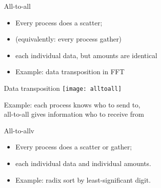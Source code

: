 
\begin{exerciseframe}[scangather]
  
\end{exerciseframe}

\begin{numberedframe}{All-to-all}
  \begin{itemize}
  \item Every process does a scatter;
  \item (equivalently: every process gather)
  \item each individual data, but amounts are identical
  \item Example: data transposition in FFT
  \end{itemize}
\end{numberedframe}

\begin{numberedframe}{Data transposition}
  \texttt{[image: alltoall]}

  Example: each process knows who to send to, \\
  all-to-all gives information who to receive from
\end{numberedframe}

\begin{numberedframe}{All-to-allv}
  \begin{itemize}
  \item Every process does a scatter or gather;
  \item each individual data and individual amounts.
  \item Example: radix sort by least-significant digit.
  \end{itemize}
\end{numberedframe}

